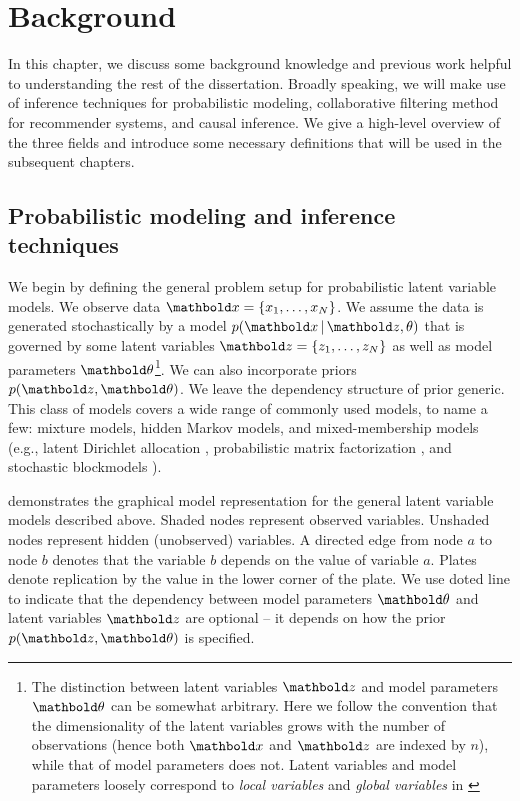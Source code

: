 

\chapter{Background}\label{chpt:background}

In this chapter, we discuss some background knowledge and previous work helpful to understanding the rest of the dissertation. 
Broadly speaking, we will make use of inference techniques for probabilistic modeling, collaborative filtering method for recommender systems, and causal inference. We give a high-level overview of the three fields and introduce some necessary definitions that will be used in the subsequent chapters. 

\section{Probabilistic modeling and inference techniques}\label{chpt:background:sec:inference}

We begin by defining the general problem setup for probabilistic latent variable models. We observe data $\mbx = \{x_1, \dots, x_N\}$. We assume the data is generated stochastically by a model $p(\mbx \g \mbz, \theta)$ that is governed by some latent variables $\mbz = \{z_1, \dots, z_N\}$ as well as model parameters $\mb\theta$\footnote{The distinction between latent variables $\mbz$ and model parameters $\mb\theta$ can be somewhat arbitrary. Here we follow the convention that the dimensionality of the latent variables grows with the number of observations (hence both $\mbx$ and $\mbz$ are indexed by $n$), while that of model parameters does not. Latent variables and model parameters loosely correspond to \textit{local variables} and \textit{global variables} in \citet{hoffman2013stochastic}}. We can also incorporate priors $p(\mbz, \mb\theta)$. We leave the dependency structure of prior generic. This class of models covers a wide range of commonly used models, to name a few: mixture models, hidden Markov models, and mixed-membership models (e.g., latent Dirichlet allocation \citep{blei2003latent}, probabilistic matrix factorization \citep{salakhutdinov2008probabilistic}, and stochastic blockmodels \citep{DBLP:journals/jmlr/AiroldiBFX08}).

 demonstrates the graphical model representation for the general latent variable models described above. Shaded nodes represent observed variables. Unshaded nodes represent
hidden (unobserved) variables. A directed edge from node $a$ to node $b$
denotes that the variable $b$ depends on the value of variable
$a$. Plates denote replication by the value in the lower corner
of the plate. We use doted line to indicate that the dependency between model parameters $\mb\theta$ and latent variables $\mbz$ are optional -- it depends on how the prior $p(\mbz, \mb\theta)$ is specified. 

